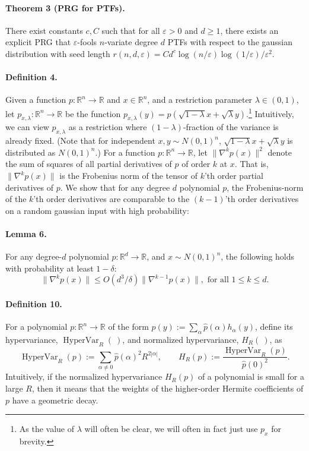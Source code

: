 \documentclass[10pt,a4paper]{article}
\begin{document}
\paragraph{Theorem 3 (PRG for PTFs).} There exist constants $c,C$ such that for all $\varepsilon>0$ and $d\geq1$, there exists an explicit PRG that $\varepsilon$-fools $n$-variate degree $d$ PTFs with respect to the gaussian distribution with seed length $r(n,d,\varepsilon)=Cd^c\log(n/\varepsilon)\log(1/\varepsilon)/\varepsilon^2$.

\paragraph{Definition 4.} Given a function $p:\mathbb R^n\to\mathbb R$ and $x\in\mathbb R^n$, and a restriction parameter $\lambda\in(0,1)$, let $p_{x,\lambda}:\mathbb R^n\to\mathbb R$ be the function $p_{x,\lambda}(y)=p(\sqrt{1-\lambda}x+\sqrt\lambda y)$.\footnote{As the value of $\lambda$ will often be clear, we will often in fact just use $p_x$ for brevity.}
Intuitively, we can view $p_{x,\lambda}$ as a restriction where $(1-\lambda)$-fraction of the variance is already fixed. (Note that for independent $x,y\sim N(0,1)^n$, $\sqrt{1-\lambda}x+\sqrt\lambda y$ is distributed as $N(0,1)^n$.)
For a function $p:\mathbb R^n\to\mathbb R$, let $\|\nabla^kp(x)\|^2$ denote the sum of squares of all partial derivatives of $p$ of order $k$ at $x$. That is, $\|\nabla^kp(x)\|$ is the Frobenius norm of the tensor of $k$'th order partial derivatives of $p$. We show that for any degree $d$ polynomial $p$, the Frobenius-norm of the $k$'th order derivatives are comparable to the $(k-1)$'th order derivatives on a random gaussian input with high probability:
\paragraph{Lemma 6.} For any degree-$d$ polynomial $p:\mathbb R^d\to\mathbb R$, and $x\sim N(0,1)^n$, the following holds with probability at least $1-\delta$:
\[\|\nabla^kp(x)\|\leq O(d^3/\delta)\|\nabla^{k-1}p(x)\|,\text{ for all }1\leq k\leq d.\tag{1}\]
\paragraph{Definition 10.} For a polynomial $p:\mathbb R^n\to\mathbb R$ of the form $p(y):=\sum_\alpha\widehat p(\alpha)h_\alpha(y)$, define its hypervariance, $\operatorname{HyperVar}_R(\ )$, and normalized hypervariance, $H_R(\ )$, as
\[\operatorname{HyperVar}_R(p):=\sum_{\alpha\neq0}\widehat p(\alpha)^2R^{2|\alpha|},\qquad H_R(p):=\frac{\operatorname{HyperVar}_R(p)}{\widehat p(0)^2}.\]
Intuitively, if the normalized hypervariance $H_R(p)$ of a polynomial is small for a large $R$, then it means that the weights of the higher-order Hermite coefficients of $p$ have a geometric decay.
\end{document}

